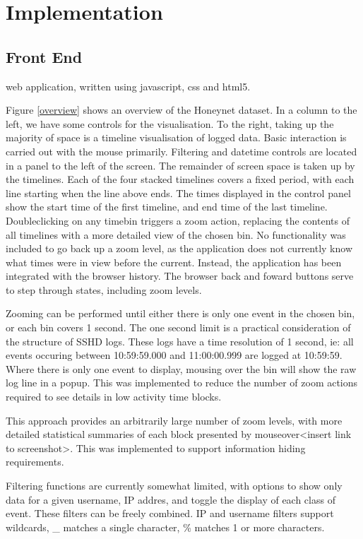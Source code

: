 \chapter{Implementation}\label{C:impl}

\section{Front End}  %

web application, written using javascript, css and html5.

Figure \ref{overview} shows an overview of the Honeynet dataset. In a column to the left, we have some controls for the visualisation. To the right, taking up the majority of space is a timeline visualisation of logged data.  
Basic interaction is carried out with the mouse primarily. Filtering and datetime controls are located in a panel to the left of the screen. The remainder of screen space is taken up by the timelines. 
Each of the four stacked timelines covers a fixed period, with each line starting when the line above ends. The times displayed in the control panel show the start time of the first timeline, and end time of the last timeline.
Doubleclicking on any timebin triggers a zoom action, replacing the contents of all timelines with a more detailed view of the chosen bin. 
No functionality was included to go back up a zoom level, as the application does not currently know what times were in view before the current. Instead, the application has been integrated with the browser history. The browser back and foward buttons serve to step through states, including zoom levels. 

Zooming can be performed until either there is only one event in the chosen bin, or each bin covers 1 second. The one second limit is a practical consideration of the structure of SSHD logs. These logs have a time resolution of 1 second, ie:  all events occuring between 10:59:59.000 and 11:00:00.999 are logged at 10:59:59. Where there is only one event to display, mousing over the bin will show the raw log line in a popup. This was implemented to reduce the number of zoom actions required to see details in low activity time blocks. 

This approach provides an arbitrarily large number of zoom levels, with more detailed statistical summaries of each block presented by mouseover<insert link to screenshot>. This was implemented to support information hiding requirements. 

Filtering functions are currently somewhat limited, with options to show only data for a given username, IP addres, and toggle the display of each class of event. These filters can be freely combined. IP and username filters support wildcards, \_ matches a single character, \% matches 1 or more characters. 

